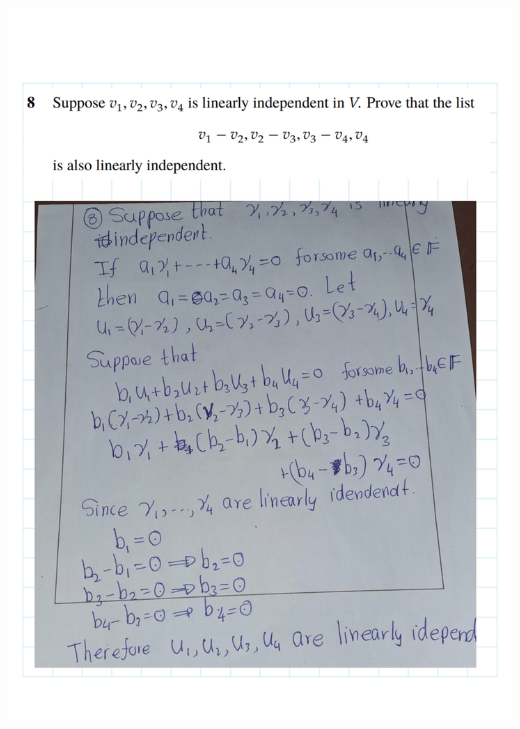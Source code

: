 \documentclass[
]{book}
\theoremstyle{definition}
\theoremstyle{definition}
\theoremstyle{definition}
\theoremstyle{definition}
\theoremstyle{remark}
\begin{document}
\includegraphics{fig/Ex2A/Ex2A-10.png}
\end{document}
